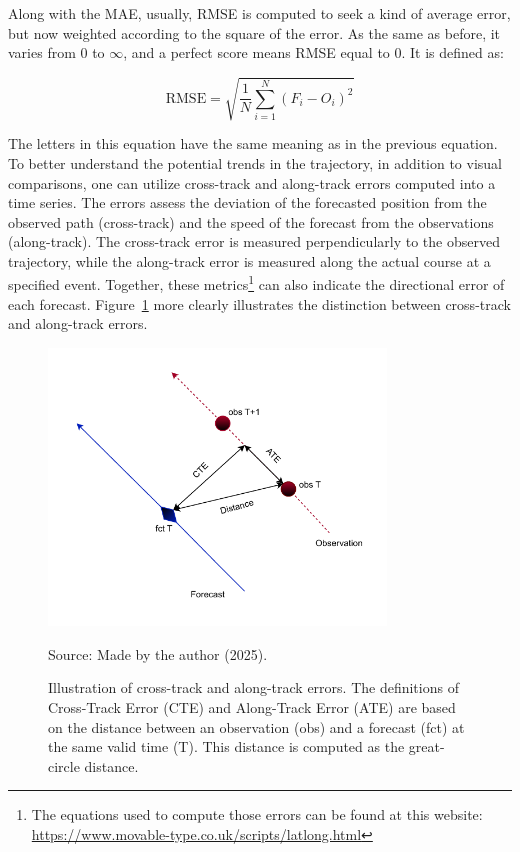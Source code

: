 Along with the MAE, usually, RMSE is computed to seek a kind of average error, but now weighted according to the square of the error. As the same as before, it varies from 0 to $\infty$, and a perfect score means RMSE equal to 0. It is defined as:

\begin{equation}
    \text{RMSE} = \sqrt{\frac{1}{N}\sum_{i=1}^{N} (F_i -O_i)^2}
\end{equation}

The letters in this equation have the same meaning as in the previous equation. To better understand the potential trends in the trajectory, in addition to visual comparisons, one can utilize cross-track and along-track errors computed into a time series. The errors assess the deviation of the forecasted position from the observed path (cross-track) and the speed of the forecast from the observations (along-track). The cross-track error is measured perpendicularly to the observed trajectory, while the along-track error is measured along the actual course at a specified event. Together, these metrics\footnote{The equations used to compute those errors can be found at this website: \url{https://www.movable-type.co.uk/scripts/latlong.html}} can also indicate the directional error of each forecast. Figure~\ref{fig:cross-along-errors} more clearly illustrates the distinction between cross-track and along-track errors. 

\begin{figure}[htbp]
    \centering
    \caption{Illustration of cross-track and along-track errors. The definitions of Cross-Track Error (CTE) and Along-Track Error (ATE) are based on the distance between an observation (obs) and a forecast (fct) at the same valid time (T). This distance is computed as the great-circle distance.} %
    \includegraphics[width=0.8\textwidth]{docs/figuras/ch_3.4.0.1/cte_ate.pdf} 
    \label{fig:cross-along-errors}
    \vspace{0.5em}
    
    \centering
    Source: Made by the author (2025).
\end{figure}

